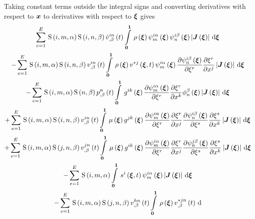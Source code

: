 Taking constant terms outside the integral signs and converting derivatives
with respect to $ \boldsymbol{x} $ to derivatives with respect to $ \boldsymbol{\xi} $ gives
\begin{multline}
  \gsum{e=1}{E}{\idxgsf{i}{m}{\alpha}\idxgsf{i}{n}{\beta}\fnof{\idxnodedof{\dot{v}}{i}{n}{\beta}}{t}
    \gint{\vectr{0}}{\vectr{1}}{\fnof{\rho}{\vectr{\xi}}
      \idxgbfn{i}{m}{\alpha}{\vectr{\xi}}\idxgbfn{i}{n}{\beta}{\vectr{\xi}}
      \abs{\fnof{\matr{J}}{\vectr{\xi}}}}{\vectr{\xi}}}\\
  -\gsum{e=1}{E}{\idxgsf{i}{m}{\alpha}\idxgsf{i}{n}{\beta}\fnof{\idxnodedof{v}{i}{n}{\beta}}{t}
    \gint{\vectr{0}}{\vectr{1}}{\fnof{\rho}{\vectr{\xi}}\fnof{v^{*j}}{\vectr{\xi},t}
      \idxgbfn{i}{m}{\alpha}{\vectr{\xi}}\delby{\idxgbfn{i}{n}{\beta}{\vectr{\xi}}}{\xi^{r}}
      \delby{\xi^{r}}{x^{j}}\abs{\fnof{\matr{J}}{\vectr{\xi}}}}{\vectr{\xi}}}\\
  -\gsum{e=1}{E}{\idxgsf{i}{m}{\alpha}\gsf{n}{\beta}\fnof{\nodedof{p}{n}{\beta}}{t}\gint{\vectr{0}}{\vectr{1}}{
      \fnof{g^{ik}}{\vectr{\xi}}\delby{\idxgbfn{i}{m}{\alpha}{\vectr{\xi}}}{\xi^{r}}\delby{\xi^{r}}{x^{k}}
      \altgbfn{n}{\beta}{\vectr{\xi}}\abs{\fnof{\matr{J}}{\vectr{\xi}}}}{\vectr{\xi}}}\\
  +\gsum{e=1}{E}{\idxgsf{i}{m}{\alpha}\idxgsf{i}{n}{\beta}\fnof{\idxnodedof{v}{i}{n}{\beta}}{t}\gint{\vectr{0}}{\vectr{1}}{
      \fnof{\mu}{\vectr{\xi}}\fnof{g^{jk}}{\vectr{\xi}}\delby{\idxgbfn{i}{m}{\alpha}{\vectr{\xi}}}{\xi^{r}}
      \delby{\xi^{r}}{x^{j}}\delby{\idxgbfn{i}{n}{\beta}{\vectr{\xi}}}{\xi^{s}}\delby{\xi^{s}}{x^{k}}
      \abs{\fnof{\matr{J}}{\vectr{\xi}}}}{\vectr{\xi}}}\\
  +\gsum{e=1}{E}{\idxgsf{i}{m}{\alpha}\idxgsf{j}{n}{\beta}\fnof{\idxnodedof{v}{j}{n}{\beta}}{t}
    \gint{\vectr{0}}{\vectr{1}}{\fnof{\mu}{\vectr{\xi}}\fnof{g^{ik}}{\vectr{\xi}}\delby{\idxgbfn{i}{m}{\alpha}{\vectr{\xi}}}{\xi^{r}}
      \delby{\xi^{r}}{x^{j}}\delby{\idxgbfn{j}{n}{\beta}{\vectr{\xi}}}{\xi^{s}}\delby{\xi^{s}}{x^{k}}
      \abs{\fnof{\matr{J}}{\vectr{\xi}}}}{\vectr{\xi}}} \\
  -\gsum{e=1}{E}{\idxgsf{i}{m}{\alpha}\gint{\vectr{0}}{\vectr{1}}{\fnof{s^{i}}{\vectr{\xi},t}
      \idxgbfn{i}{m}{\alpha}{\vectr{\xi}}\abs{\fnof{\matr{J}}{\vectr{\xi}}}}{\vectr{\xi}}}\\
  -\gsum{e=1}{E}{\idxgsf{i}{m}{\alpha}\idxgsf{j}{n}{\beta}\fnof{\idxnodedof{v}{h}{n}{\beta}}{t}
    \gint{\vectr{0}}{\vectr{1}}{\fnof{\rho}{\vectr{\xi}}\fnof{\idxnodedof{v}{*j}{n}{\beta}}{t}
}}
\end{multline}
